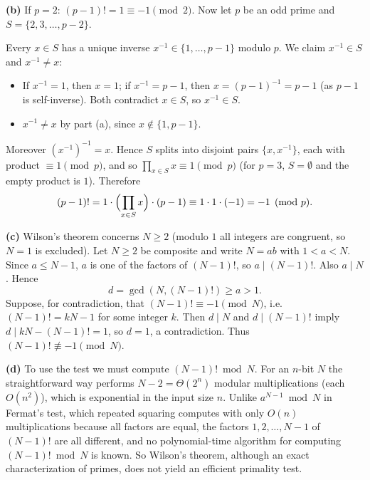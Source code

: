 \documentclass[11pt]{article}
\theoremstyle{definition}
\begin{document}
\textbf{(b)} If $p=2$: $(p-1)!=1\equiv-1\pmod 2$. Now let $p$ be an odd prime and
$S=\{2,3,\dots,p-2\}$.

Every $x\in S$ has a unique inverse $x^{-1}\in\{1,\dots,p-1\}$ modulo $p$. We claim $x^{-1}\in S$ and
$x^{-1}\neq x$:
\begin{itemize}[itemsep=0.2em]
\item If $x^{-1}=1$, then $x=1$; if $x^{-1}=p-1$, then $x=(p-1)^{-1}=p-1$ (as $p-1$ is self-inverse).
  Both contradict $x\in S$, so $x^{-1}\in S$.
\item $x^{-1}\neq x$ by part (a), since $x\notin\{1,p-1\}$.
\end{itemize}
Moreover $(x^{-1})^{-1}=x$. Hence $S$ splits into disjoint pairs $\{x,x^{-1}\}$, each with product
$\equiv1\pmod p$, and so $\prod_{x\in S}x\equiv1\pmod p$ (for $p=3$, $S=\emptyset$ and the empty product is $1$).
Therefore
\[
  (p-1)!=1\cdot\Bigl(\prod_{x\in S}x\Bigr)\cdot(p-1)\equiv1\cdot1\cdot(-1)=-1\pmod p .
\]

\textbf{(c)} Wilson's theorem concerns $N\ge2$ (modulo $1$ all integers are congruent, so $N=1$ is excluded).
Let $N\ge2$ be composite and write $N=ab$ with $1<a<N$. Since $a\le N-1$, $a$ is one of the factors of $(N-1)!$, so
$a\mid(N-1)!$. Also $a\mid N$. Hence
\[
  d=\gcd(N,(N-1)!)\ge a>1 .
\]
Suppose, for contradiction, that $(N-1)!\equiv-1\pmod N$, i.e.\ $(N-1)!=kN-1$ for some integer $k$. Then
$d\mid N$ and $d\mid(N-1)!$ imply $d\mid kN-(N-1)!=1$, so $d=1$, a contradiction.
Thus $(N-1)!\not\equiv-1\pmod N$.

\textbf{(d)} To use the test we must compute $(N-1)!\bmod N$. For an $n$-bit $N$ the straightforward way
performs $N-2=\Theta(2^n)$ modular multiplications (each $O(n^2)$), which is exponential in the input size $n$.
Unlike $a^{N-1}\bmod N$ in Fermat's test, which repeated squaring computes with only $O(n)$
multiplications because all factors are equal, the factors $1,2,\dots,N-1$ of $(N-1)!$ are all different,
and no polynomial-time algorithm for computing $(N-1)!\bmod N$ is known. So Wilson's theorem, although an exact
characterization of primes, does not yield an efficient primality test.
\end{document}
